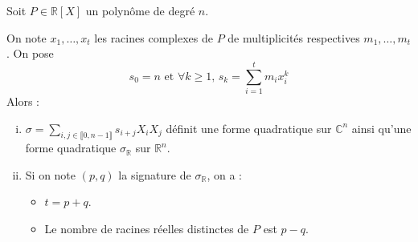 






	Soit $P \in \mathbb{R}[X]$ un polynôme de degré $n$.

	\begin{theorem}
		On note $x_1, \dots, x_t$ les racines complexes de $P$ de multiplicités respectives $m_1, \dots, m_t$. On pose
		\[ s_0 = n \text{ et } \forall k \geq 1, \, s_k = \sum_{i=1}^t m_i x_i^k \]
		Alors :
		\begin{enumerate}[(i)]
			\item $\sigma = \sum_{i, j \in \llbracket 0, n-1 \rrbracket} s_{i+j} X_i X_j$ définit une forme quadratique sur $\mathbb{C}^n$ ainsi qu'une forme quadratique $\sigma_{\mathbb{R}}$ sur $\mathbb{R}^n$.
			\item Si on note $(p,q)$ la signature de $\sigma_{\mathbb{R}}$, on a :
			\begin{itemize}
				\item $t = p + q$.
				\item Le nombre de racines réelles distinctes de $P$ est $p-q$.
			\end{itemize}
		\end{enumerate}
	\end{theorem}

